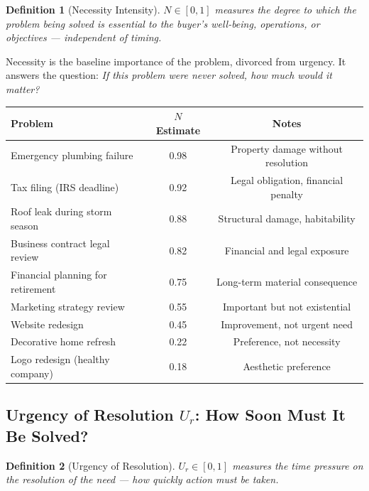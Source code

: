 \documentclass[12pt, openany]{book}
\theoremstyle{thmstyle}
\theoremstyle{defstyle}
\newtheorem{definition}{Definition}[chapter]
\begin{document}
\begin{definition}[Necessity Intensity]
$N \in [0, 1]$ measures the degree to which the problem being solved is essential to the buyer's well-being, operations, or objectives --- independent of timing.
\end{definition}

Necessity is the baseline importance of the problem, divorced from urgency. It answers the question: \textit{If this problem were never solved, how much would it matter?}

\begin{center}
\begin{tabular}{lcc}
\toprule
\textbf{Problem} & \textbf{$N$ Estimate} & \textbf{Notes} \\
\midrule
Emergency plumbing failure & 0.98 & Property damage without resolution \\
Tax filing (IRS deadline) & 0.92 & Legal obligation, financial penalty \\
Roof leak during storm season & 0.88 & Structural damage, habitability \\
Business contract legal review & 0.82 & Financial and legal exposure \\
Financial planning for retirement & 0.75 & Long-term material consequence \\
Marketing strategy review & 0.55 & Important but not existential \\
Website redesign & 0.45 & Improvement, not urgent need \\
Decorative home refresh & 0.22 & Preference, not necessity \\
Logo redesign (healthy company) & 0.18 & Aesthetic preference \\
\bottomrule
\end{tabular}
\end{center}

\subsection{Urgency of Resolution $U_r$: How Soon Must It Be Solved?}

\begin{definition}[Urgency of Resolution]
$U_r \in [0, 1]$ measures the time pressure on the resolution of the need --- how quickly action must be taken.
\end{definition}
\end{document}
